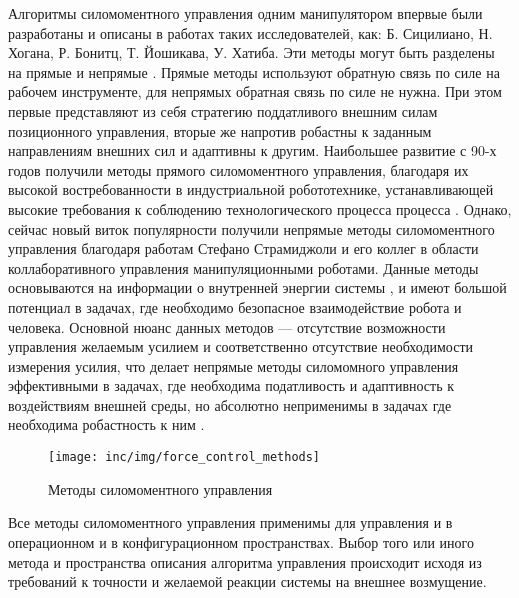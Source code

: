 Алгоритмы силомоментного управления одним манипулятором впервые были разработаны и описаны в работах таких исследователей, как: Б. Сицилиано, Н. Хогана, Р. Бонитц, Т. Йошикава, У. Хатиба. Эти методы могут быть разделены на прямые и непрямые \cite{Handbook}. Прямые методы используют обратную связь по силе на рабочем инструменте, для непрямых обратная связь по силе не нужна. При этом первые представляют из себя стратегию поддатливого внешним силам позиционного управления, вторые же напротив робастны к заданным направлениям внешних сил и адаптивны к другим. Наибольшее развитие с 90-х годов получили методы прямого силомоментного управления, благодаря их высокой востребованности в индустриальной робототехнике, устанавливающей высокие требования к соблюдению технологического процесса процесса \cite{Ha1999}. Однако, сейчас новый виток популярности получили непрямые методы силомоментного управления благодаря работам Стефано Страмиджоли и его коллег в области коллаборативного управления манипуляционными роботами. Данные методы основываются на информации о внутренней энергии системы \cite{StarmidgoliImpedanceControl}, \cite{StarmidgoliImpedanceControl2} и имеют большой потенциал в задачах, где необходимо безопасное взаимодействие робота и человека. Основной нюанс данных методов --- отсутствие возможности управления желаемым усилием и соответственно отсутствие необходимости измерения усилия, что делает непрямые методы силомомного управления эффективными в задачах, где необходима податливость и адаптивность к воздействиям внешней среды, но абсолютно неприменимы в задачах где необходима робастность к ним \cite{indirect_to_direct}.\\

\begin{figure}
  \texttt{[image: inc/img/force\_control\_methods]}
  \caption{Методы силомоментного управления}
  \label{split_fs_control}
\end{figure}

Все методы силомоментного управления применимы для управления и в операционном и в конфигурационном пространствах. Выбор того или иного метода и пространства описания алгоритма управления происходит исходя из требований к точности и желаемой реакции системы на внешнее возмущение.
